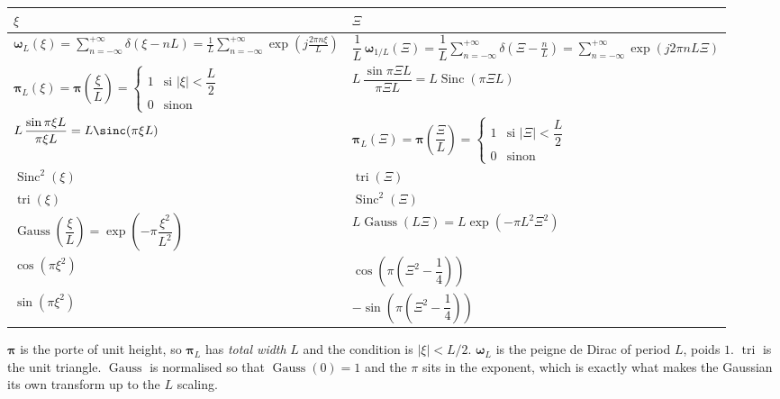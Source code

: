 \begin{table}[h!]
  \centering
  \begin{tabularx}{\textwidth}{>{\centering\arraybackslash}X >{\centering\arraybackslash}X}
    \toprule
    $\xi$ & $\Xi$ \\
    \midrule
    $\boldsymbol{\omega}_L(\xi)=\displaystyle\sum_{n=-\infty}^{+\infty}\delta(\xi-nL)
      =\frac{1}{L}\sum_{n=-\infty}^{+\infty}\exp\!\left(j\frac{2\pi n\xi}{L}\right)$
    & $\dfrac{1}{L}\,\boldsymbol{\omega}_{1/L}(\Xi)
      =\dfrac{1}{L}\displaystyle\sum_{n=-\infty}^{+\infty}\delta\!\left(\Xi-\frac{n}{L}\right)
      =\sum_{n=-\infty}^{+\infty}\exp(j2\pi nL\Xi)$ \\[22pt]
    $\boldsymbol{\pi}_L(\xi)=\boldsymbol{\pi}\!\left(\dfrac{\xi}{L}\right)=
      \begin{cases}
        1 & \text{si } |\xi|<\dfrac{L}{2}\\[4pt]
        0 & \text{sinon}
      \end{cases}$
    & $L\,\dfrac{\sin \pi\Xi L}{\pi\Xi L}=L\operatorname{Sinc}(\pi\Xi L)$ \\[16pt]
    $L\,\dfrac{\sin \pi\xi L}{\pi\xi L}=L\sinc(\pi\xi L)$
    & $\boldsymbol{\pi}_L(\Xi)=\boldsymbol{\pi}\!\left(\dfrac{\Xi}{L}\right)=
      \begin{cases}
        1 & \text{si } |\Xi|<\dfrac{L}{2}\\[4pt]
        0 & \text{sinon}
      \end{cases}$ \\[16pt]
    $\operatorname{Sinc}^2(\xi)$ & $\operatorname{tri}(\Xi)$ \\[6pt]
    $\operatorname{tri}(\xi)$ & $\operatorname{Sinc}^2(\Xi)$ \\[6pt]
    $\operatorname{Gauss}\!\left(\dfrac{\xi}{L}\right)=\exp\!\left(-\pi\dfrac{\xi^2}{L^2}\right)$
    & $L\operatorname{Gauss}(L\Xi)=L\exp(-\pi L^2\Xi^2)$ \\[12pt]
    $\cos(\pi\xi^2)$ & $\cos\!\left(\pi\left(\Xi^2-\dfrac{1}{4}\right)\right)$ \\[12pt]
    $\sin(\pi\xi^2)$ & $-\sin\!\left(\pi\left(\Xi^2-\dfrac{1}{4}\right)\right)$ \\
    \bottomrule
  \end{tabularx}
\end{table}

\clearpage

\begin{remark}
  $\boldsymbol{\pi}$ is the porte of unit height, so
  $\boldsymbol{\pi}_L$ has \emph{total width} $L$ and the condition is
  $|\xi|<L/2$. $\boldsymbol{\omega}_L$ is the peigne de Dirac of period $L$,
  poids $1$. $\operatorname{tri}$ is
  the unit triangle. $\operatorname{Gauss}$ is normalised so that
  $\operatorname{Gauss}(0)=1$ and the $\pi$ sits in the exponent, which is
  exactly what makes the Gaussian its own transform up to the $L$ scaling.
\end{remark}

